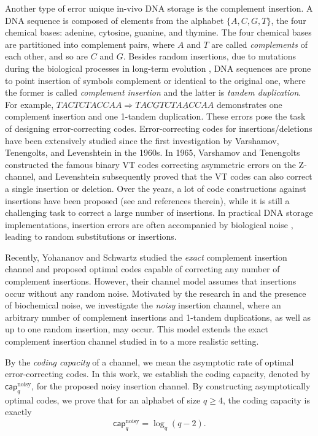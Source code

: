 \documentclass[pdflatex,sn-mathphys-num]{sn-jnl}
\theoremstyle{theorem}%
\theoremstyle{definition}
\theoremstyle{construction}
\newtheorem{open problem}{Open problem}
\begin{document}
 Another type of error unique in-vivo DNA storage is the complement insertion. A DNA sequence is composed of elements from the alphabet $ \{A, C, G, T\} $,  the four chemical bases: adenine, cytosine, guanine, and thymine. The four chemical bases are partitioned into complement pairs, where $A$ and $T$ are called \emph{complements} of each other, and so are $C$ and $G$. Besides random insertions, due to mutations during the biological processes in long-term evolution \cite{mh,sr}, DNA sequences are prone to point insertion of symbols complement or identical to the original one, where the former is called \emph{complement insertion} and the latter is \textit{tandem duplication}. For example, $TACTCTACCAA\Longrightarrow TAC\underline{G}TCTA\underline{A}CCAA$  demonstrates one complement insertion and one 1-tandem duplication. These errors pose the task of designing error-correcting codes. Error-correcting codes for insertions/deletions have been extensively studied since the first investigation by Varshamov, Tenengolts, and Levenshtein in the 1960s. In 1965, Varshamov and Tenengolts \cite{1965VT} constructed the famous binary VT codes correcting asymmetric errors on the Z-channel, and Levenshtein \cite{vi} subsequently proved that the VT codes can also correct a single insertion or deletion. Over the years, a lot of code constructions against insertions have been proposed (see \cite{Helberg, lius,Gabrys,Sima, lz} and references therein), while it is still a challenging task to correct a large number of insertions. In practical DNA storage implementations, insertion errors are often accompanied by biological noise \cite{Pumpernik2008}, leading to random substitutions or insertions. 
 
 Recently, Yohananov and Schwartz \cite{ys2} studied the \emph{exact} complement insertion channel and proposed optimal codes capable of correcting any number of complement insertions. However, their channel model assumes that insertions occur without any random noise. Motivated by the research in \cite{ys2} and the presence of biochemical noise, we investigate the \emph{noisy} insertion channel, where an arbitrary number of complement insertions and 1-tandem duplications, as well as up to one random insertion, may occur. This model extends the exact complement insertion channel studied in \cite{ys2} to a more realistic setting.
 
 By the \emph{coding capacity} of a channel, we mean the asymptotic rate of optimal error-correcting codes. In this work, we establish the coding capacity, denoted by $\mathsf{cap}^{\text{noisy}}_{q}$, for the proposed noisy insertion channel. By constructing asymptotically optimal codes, we prove that for an alphabet of size $q \ge 4$, the coding capacity is exactly
 $$\mathsf{cap}^{\text{noisy}}_{q} = \log_{q}(q-2).$$
 
\end{document}
